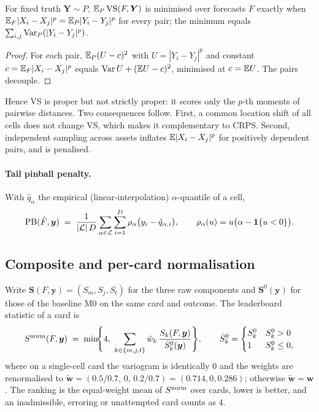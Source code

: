 \begin{proposition}\label{prop:vs-opt}
For fixed truth $\bm Y\sim P$, $\mathbb{E}_P\operatorname{VS}(F,\bm Y)$ is minimised over forecasts $F$ exactly when
$\mathbb{E}_F|X_i-X_j|^p=\mathbb{E}_P|Y_i-Y_j|^p$ for every pair; the minimum equals $\sum_{i,j}\operatorname{Var}_P(|Y_i-Y_j|^p)$.
\end{proposition}
\begin{proof}
For each pair, $\mathbb{E}_P(U-c)^2$ with $U=|Y_i-Y_j|^p$ and constant $c=\mathbb{E}_F|X_i-X_j|^p$ equals $\operatorname{Var} U+(\mathbb{E} U-c)^2$, minimised at $c=\mathbb{E} U$.
The pairs decouple.
\end{proof}
Hence VS is proper but not strictly proper: it scores only the $p$-th moments of pairwise distances. Two consequences follow. First, a
common location shift of all cells does not change VS, which makes it complementary to CRPS. Second, independent sampling across
assets inflates $\mathbb{E}|X_i-X_j|^p$ for positively dependent pairs, and is penalised.

\paragraph{Tail pinball penalty.} With $\hat q_\alpha$ the empirical (linear-interpolation) $\alpha$-quantile of a cell,
\begin{equation}\label{eq:pb}
  \operatorname{PB}(\hat F,\bm y) \;=\; \frac{1}{|\mathcal L|\,D}\sum_{\alpha\in\mathcal L}\sum_{i=1}^{D}\rho_\alpha\bigl(y_i-\hat q_{\alpha,i}\bigr),\qquad
  \rho_\alpha(u)=u\bigl(\alpha-\mathbf{1}\{u<0\}\bigr).
\end{equation}

\subsection{Composite and per-card normalisation}

Write $\bm S(F,\bm y)=(S_m,S_j,S_t)$ for the three raw components and $\bm S^{0}(\bm y)$ for those of the baseline M0 on the same card and
outcome. The leaderboard statistic of a card is
\begin{equation}\label{eq:snorm}
  S^{\mathrm{norm}}(F,\bm y) \;=\; \min\!\Biggl\{4,\ \sum_{k\in\{m,j,t\}} \tilde w_k\,\frac{S_k(F,\bm y)}{\bar S^{0}_k(\bm y)}\Biggr\},
  \qquad \bar S^0_k = \begin{cases} S^0_k & S^0_k>0\\ 1 & S^0_k\le 0,\end{cases}
\end{equation}
where on a single-cell card the variogram is identically $0$ and the weights are renormalised to
$\tilde{\bm w}=(0.5/0.7,\,0,\,0.2/0.7)=(0.714,0,0.286)$; otherwise $\tilde{\bm w}=\bm w$. The ranking is the equal-weight mean of
$S^{\mathrm{norm}}$ over cards, lower is better, and an inadmissible, erroring or unattempted card counts as $4$.

